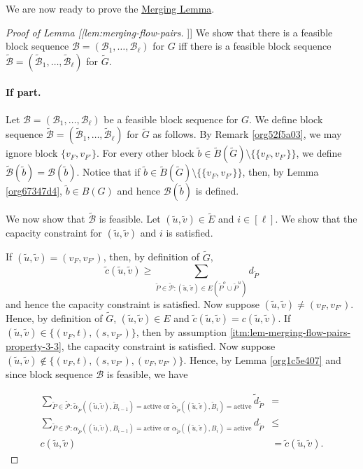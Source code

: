 \documentclass[fontsize=11pt,paper=a4]{book}
\begin{document}
We are now ready to prove the \hyperref[org859ddb4]{Merging Lemma}.

\begin{proof}[Proof of Lemma [[lem:merging-flow-pairs]]]
We show that there is a feasible block sequence \(\mathcal{B}=(\mathscr{B}_1,\dots,\mathscr{B}_{\ell})\) for \(G\) iff there is a feasible block sequence \(\tilde{\mathcal{B}}=(\tilde{\mathscr{B}}_1,\dots,\tilde{\mathscr{B}}_{\ell})\) for \(\tilde{G}\).

\paragraph{If part.}
Let \(\mathcal{B}=(\mathscr{B}_1,\dots,\mathscr{B}_{\ell})\) be a feasible block sequence for \(G\).
We define block sequence \(\tilde{\mathcal{B}}=(\tilde{\mathscr{B}}_1,\dots,\tilde{\mathscr{B}}_{\ell})\) for \(\tilde{G}\) as follows.
By Remark \ref{org52f5a03}, we may ignore block \(\{v_F,v_{F'}\}\).
For every other block \(\tilde{b}\in\tilde{B}(\tilde{G})\setminus\{\{v_F,v_{F'}\}\}\), we define \(\tilde{\mathcal{B}}(\tilde{b})=\mathcal{B}(\tilde{b})\).
Notice that if \(\tilde{b}\in\tilde{B}(\tilde{G})\setminus\{\{v_F,v_{F'}\}\}\), then, by Lemma \ref{org67347d4}, \(\tilde{b}\in B(G)\) and hence \(\mathcal{B}(\tilde{b})\) is defined.

We now show that \(\tilde{\mathcal{B}}\) is feasible.
Let \((\tilde{u},\tilde{v})\in\tilde{E}\) and \(i\in[\ell]\).
We show that the capacity constraint for \((\tilde{u},\tilde{v})\) and \(i\) is satisfied.

If \((\tilde{u},\tilde{v})=(v_F,v_{F'})\), then, by definition of \(\tilde{G}\),
\[
\tilde{c}(\tilde{u},\tilde{v})\geq\sum_{\tilde{P}\in\tilde{\mathcal{P}}:(\tilde{u},\tilde{v})\in E(\tilde{P}^o\cup\tilde{P}^u)}d_{\tilde{P}}
\]
and hence the capacity constraint is satisfied.
Now suppose \((\tilde{u},\tilde{v})\neq(v_F,v_{F'})\).
Hence, by definition of \(\tilde{G}\), \((\tilde{u},\tilde{v})\in E\) and \(\tilde{c}(\tilde{u},\tilde{v})=c(\tilde{u},\tilde{v})\).
If \((\tilde{u},\tilde{v})\in\{(v_F,t),(s,v_{F'})\}\), then by assumption \ref{itm:lem-merging-flow-pairs-property-3-3}, the capacity constraint is satisfied.
Now suppose \((\tilde{u},\tilde{v})\notin\{(v_F,t),(s,v_{F'}),(v_F,v_{F'})\}\).
Hence, by Lemma \ref{org1c5e407} and since block sequence \(\mathcal{B}\) is feasible, we have

\begin{align*}
\sum_{\tilde{P}\in\tilde{\mathcal{P}}:\tilde{\alpha}_{\tilde{P}}((\tilde{u},\tilde{v}),\tilde{B}_{i-1})=\mathrm{active}\text{ or }\tilde{\alpha}_{\tilde{P}}((\tilde{u},\tilde{v}),\tilde{B}_i)=\mathrm{active}}\tilde{d}_{\tilde{P}}&=\\
\sum_{\tilde{P}\in\mathcal{P}:\alpha_{\tilde{P}}((\tilde{u},\tilde{v}),B_{i-1})=\mathrm{active}\text{ or }\alpha_{\tilde{P}}((\tilde{u},\tilde{v}),B_i)=\mathrm{active}}d_{\tilde{P}}&\leq\\
c(\tilde{u},\tilde{v})&=
\tilde{c}(\tilde{u},\tilde{v}).
\end{align*}


\end{proof}
\end{document}
